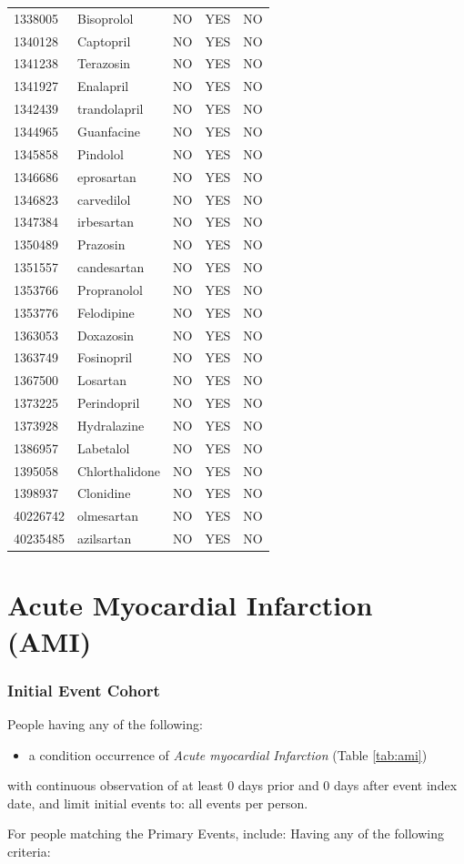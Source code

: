 \documentclass[11pt]{book}
\providecommand{\tightlist}{%
  \setlength{\itemsep}{0pt}\setlength{\parskip}{0pt}}
\theoremstyle{definition}
\theoremstyle{definition}
\theoremstyle{definition}
\theoremstyle{remark}
\begin{document}
\begin{longtable}[]{@{}lllll@{}}
1338005 & Bisoprolol & NO & YES & NO\tabularnewline
1340128 & Captopril & NO & YES & NO\tabularnewline
1341238 & Terazosin & NO & YES & NO\tabularnewline
1341927 & Enalapril & NO & YES & NO\tabularnewline
1342439 & trandolapril & NO & YES & NO\tabularnewline
1344965 & Guanfacine & NO & YES & NO\tabularnewline
1345858 & Pindolol & NO & YES & NO\tabularnewline
1346686 & eprosartan & NO & YES & NO\tabularnewline
1346823 & carvedilol & NO & YES & NO\tabularnewline
1347384 & irbesartan & NO & YES & NO\tabularnewline
1350489 & Prazosin & NO & YES & NO\tabularnewline
1351557 & candesartan & NO & YES & NO\tabularnewline
1353766 & Propranolol & NO & YES & NO\tabularnewline
1353776 & Felodipine & NO & YES & NO\tabularnewline
1363053 & Doxazosin & NO & YES & NO\tabularnewline
1363749 & Fosinopril & NO & YES & NO\tabularnewline
1367500 & Losartan & NO & YES & NO\tabularnewline
1373225 & Perindopril & NO & YES & NO\tabularnewline
1373928 & Hydralazine & NO & YES & NO\tabularnewline
1386957 & Labetalol & NO & YES & NO\tabularnewline
1395058 & Chlorthalidone & NO & YES & NO\tabularnewline
1398937 & Clonidine & NO & YES & NO\tabularnewline
40226742 & olmesartan & NO & YES & NO\tabularnewline
40235485 & azilsartan & NO & YES & NO\tabularnewline
\bottomrule
\end{longtable}

\section{Acute Myocardial Infarction (AMI)}\label{Ami}

\subsubsection*{Initial Event Cohort}\label{initial-event-cohort-2}

People having any of the following:

\begin{itemize}
\tightlist
\item
  a condition occurrence of \emph{Acute myocardial Infarction} (Table
  \ref{tab:ami})
\end{itemize}

with continuous observation of at least 0 days prior and 0 days after
event index date, and limit initial events to: all events per person.

For people matching the Primary Events, include: Having any of the
following criteria:
\end{document}
